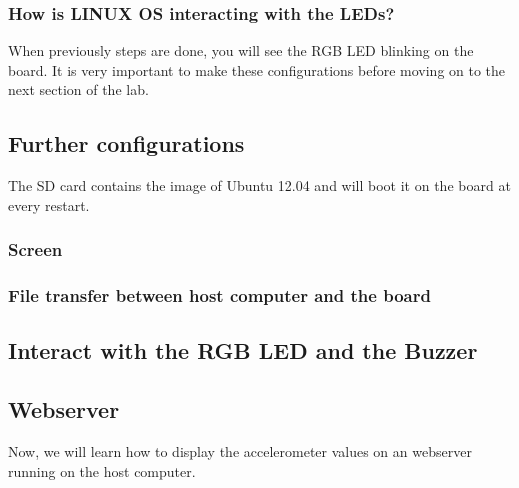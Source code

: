 \subsubsection{How is LINUX OS interacting with the LEDs?}




When previously steps are done, you will see the RGB LED blinking on the board. It is very
important to make these configurations before moving on to the next section of the lab.

\subsection{Further configurations}

The SD card contains the image of Ubuntu 12.04 and will boot it on the board at every restart.

\subsubsection{Screen}

\subsubsection{File transfer between host computer and the board}




\subsection{Interact with the RGB LED and the Buzzer}




\subsection{Webserver}
Now, we will learn how to display the accelerometer values on an webserver running
on the host computer.






